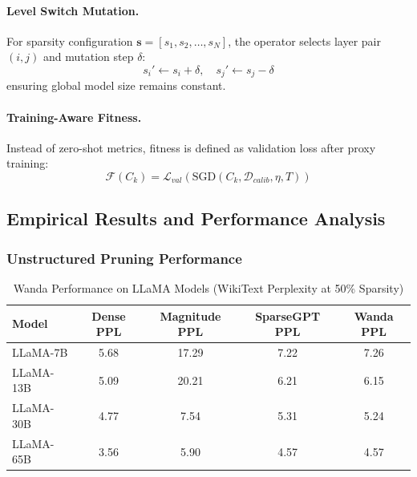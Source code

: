 \paragraph{Level Switch Mutation.}
For sparsity configuration $\mathbf{s} = [s_1, s_2, \dots, s_N]$, the operator selects layer pair $(i, j)$ and mutation step $\delta$:
\begin{equation}
	s_i' \leftarrow s_i + \delta, \quad s_j' \leftarrow s_j - \delta
\end{equation}
ensuring global model size remains constant.

\paragraph{Training-Aware Fitness.}
Instead of zero-shot metrics, fitness is defined as validation loss after proxy training:
\begin{equation}
	\mathcal{F}(C_k) = \mathcal{L}_{val} \left( \text{SGD}(C_k, \mathcal{D}_{calib}, \eta, T) \right)
\end{equation}

\subsection{Empirical Results and Performance Analysis}

\subsubsection{Unstructured Pruning Performance}

\begin{table}[H]
	\centering
	\caption{Wanda Performance on LLaMA Models (WikiText Perplexity at 50\% Sparsity)}
	\label{tab:wanda_results}
	\begin{tabular}{@{}lcccc@{}}
		\toprule
		\textbf{Model} & \textbf{Dense PPL} & \textbf{Magnitude PPL} & \textbf{SparseGPT PPL} & \textbf{Wanda PPL} \\ \midrule
		LLaMA-7B  & 5.68 & 17.29 & 7.22 & 7.26 \\
		LLaMA-13B & 5.09 & 20.21 & 6.21 & 6.15 \\
		LLaMA-30B & 4.77 & 7.54  & 5.31 & 5.24 \\
		LLaMA-65B & 3.56 & 5.90  & 4.57 & 4.57 \\
		\bottomrule
	\end{tabular}
\end{table}

